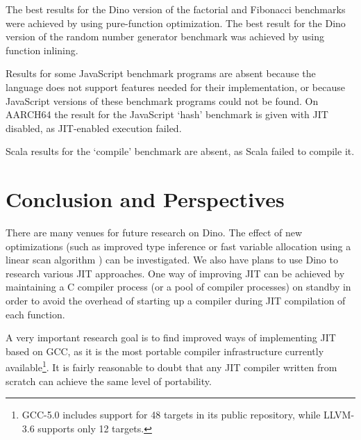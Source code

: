 \documentclass[preprint]{sigplanconf}
\begin{document}
  The best results for the Dino version of the factorial and Fibonacci benchmarks were
achieved by using pure-function optimization.  The best result
for the Dino version of the random number generator benchmark was achieved by using function inlining.

   Results for some JavaScript benchmark programs are absent because the language
does not support features needed for their implementation, or
because JavaScript versions of these benchmark programs could not be found.
On AARCH64 the result for the JavaScript `hash' benchmark is given with JIT disabled, as JIT-enabled execution failed.

Scala results for the `compile' benchmark are absent, as Scala failed to compile it.


\section{Conclusion and Perspectives}

  There are many venues for future research on Dino. The effect of new optimizations (such 
as improved type inference or fast variable allocation using a linear scan algorithm 
\cite{Poletto}) can be investigated.
We also have plans to use
Dino to research various JIT approaches. One way of improving JIT can be
achieved by maintaining a C compiler process (or a pool of compiler processes) on standby
in order to avoid the overhead of starting up a compiler during JIT compilation of each function.

  A very important research goal is to find improved ways of implementing JIT based
on GCC, as it is the most portable %
compiler infrastructure currently available\footnote{GCC-5.0 includes support for 48 targets in its public repository, while LLVM-3.6 supports only 12 targets.}.  It is
fairly reasonable to doubt that any JIT compiler written from scratch
can achieve the same level of portability.
\end{document}
